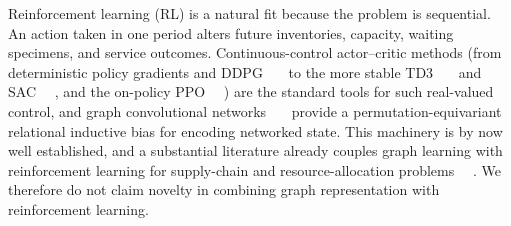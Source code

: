 \documentclass[preprint,review,12pt,nonatbib]{elsarticle}
\providecommand{\DIFadd}[1]{{\protect\color{blue}#1}} %
\providecommand{\DIFdel}[1]{} %
\providecommand{\DIFaddbegin}{} %
\providecommand{\DIFaddend}{} %
\providecommand{\DIFdelbegin}{} %
\providecommand{\DIFdelend}{} %
\providecommand{\DIFscaledelfig}{0.5}
\newlength{\DIFdelgraphicswidth} %
\newlength{\DIFdelgraphicsheight} %
\providecommand{\DIFaddincludegraphics}[2][]{{\color{blue}\fbox{\DIFOincludegraphics[#1]{#2}}}} %
\providecommand{\DIFdelincludegraphics}[2][]{%
\sbox{\DIFdelgraphicsbox}{\DIFOincludegraphics[#1]{#2}}%
\settoboxwidth{\DIFdelgraphicswidth}{\DIFdelgraphicsbox} %
\settoboxtotalheight{\DIFdelgraphicsheight}{\DIFdelgraphicsbox} %
\scalebox{\DIFscaledelfig}{%
\parbox[b]{\DIFdelgraphicswidth}{\usebox{\DIFdelgraphicsbox}\\[-\baselineskip] \rule{\DIFdelgraphicswidth}{0em}}\llap{\resizebox{\DIFdelgraphicswidth}{\DIFdelgraphicsheight}{%
\setlength{\unitlength}{\DIFdelgraphicswidth}%
\begin{picture}(1,1)%
\thicklines\linethickness{2pt} %
{\color[rgb]{1,0,0}\put(0,0){\framebox(1,1){}}}%
{\color[rgb]{1,0,0}\put(0,0){\line( 1,1){1}}}%
{\color[rgb]{1,0,0}\put(0,1){\line(1,-1){1}}}%
\end{picture}%
}\hspace*{3pt}}} %
} %
\DeclareRobustCommand{\DIFaddbegin}{\DIFOaddbegin \let\includegraphics\DIFaddincludegraphics} %
\DeclareRobustCommand{\DIFaddend}{\DIFOaddend \let\includegraphics\DIFOincludegraphics} %
\DeclareRobustCommand{\DIFdelbegin}{\DIFOdelbegin \let\includegraphics\DIFdelincludegraphics} %
\DeclareRobustCommand{\DIFdelend}{\DIFOaddend \let\includegraphics\DIFOincludegraphics} %
\begin{document}
Reinforcement learning \DIFdelbegin \DIFdel{is appropriate }\DIFdelend \DIFaddbegin \DIFadd{(RL) is a natural fit }\DIFaddend because the problem is sequential\DIFdelbegin \DIFdel{: decisions made in one epoch affect }\DIFdelend \DIFaddbegin \DIFadd{. An action taken in one period alters }\DIFaddend future inventories, \DIFdelbegin \DIFdel{resource availability}\DIFdelend \DIFaddbegin \DIFadd{capacity}\DIFaddend , waiting specimens, and service outcomes. \DIFdelbegin \DIFdel{Graph convolutional networks are appropriate because the state of the system is naturally relational: each manufacturing facility or clinic is a node, }\DIFdelend \DIFaddbegin \DIFadd{Continuous-control actor--critic methods (from deterministic policy gradients and DDPG~\mbox{%
\cite{Lillicrap2016DDPG} }\hskip0pt%
to the more stable TD3~\mbox{%
\cite{Fujimoto2018TD3} }\hskip0pt%
and SAC~\mbox{%
\cite{Haarnoja2018SAC}}\hskip0pt%
, and the on-policy PPO~\mbox{%
\cite{Schulman2017PPO}}\hskip0pt%
) are the standard tools for such real-valued control, and graph convolutional networks~\mbox{%
\cite{Kipf2017GCN} }\hskip0pt%
provide a permutation-equivariant relational inductive bias for encoding networked state. This machinery is by now well established, and a substantial literature already couples graph learning with reinforcement learning for supply-chain }\DIFaddend and \DIFdelbegin \DIFdel{transshipment, capacity-sharing, or coordination links determine how local decisions propagate through the network. }\DIFdelend \DIFaddbegin \DIFadd{resource-allocation problems~\mbox{%
\cite{Kotecha2024GNNMARL, Chang2025AAAI, Ahn2024GSP, Ahn2024GPP, Liu2024GNNMARLSurvey}}\hskip0pt%
. We therefore do not claim novelty in combining graph representation with reinforcement learning.
}
\end{document}
